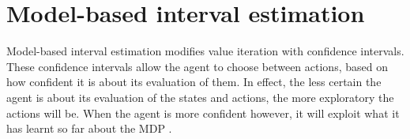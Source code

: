 \section{Model-based interval estimation}
\label{sec:mbie}

Model-based interval estimation modifies value iteration with confidence
intervals. These confidence intervals allow the agent to choose between
actions, based on how confident it is about its evaluation of them. In effect,
the less certain the agent is about its evaluation of the states and actions,
the more exploratory the actions will be. When the agent is more confident
however, it will exploit what it has learnt so far about the MDP
\parencite{dietterich2013pac}.





